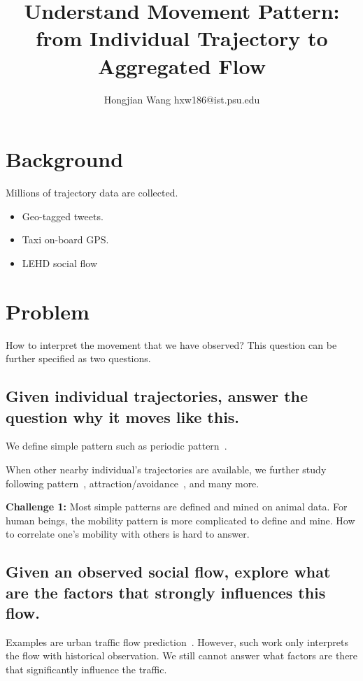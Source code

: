 \documentclass[11pt]{article}
\title{Understand Movement Pattern: from Individual Trajectory to Aggregated Flow}
\author{Hongjian Wang \qquad hxw186@ist.psu.edu}
\date{}
\begin{document}
\maketitle


\section{Background}


Millions of trajectory data are collected.

\begin{itemize}
\item Geo-tagged tweets.
\item Taxi on-board GPS.
\item LEHD social flow
\end{itemize}





\section{Problem}

How to interpret the movement that we have observed? This question can be further specified as two questions. 


\subsection{Given individual trajectories, answer the question why it moves like this.}

We define simple pattern such as periodic pattern~\cite{li2010mining}.

When other nearby individual's trajectories are available, we further study following pattern~\cite{li2010swarm}, attraction/avoidance~\cite{li2013attraction}, and many more.


\textbf{Challenge 1:} Most simple patterns are defined and mined on animal data. For human beings, the mobility pattern is more complicated to define and mine. How to correlate one's mobility with others is hard to answer.



\subsection{Given an observed social flow, explore what are the factors that strongly influences this flow.}

Examples are urban traffic flow prediction~\cite{castro2012urban}.  However, such work only interprets the flow with historical observation. We still cannot answer what factors are there that significantly influence the traffic.
\end{document}
